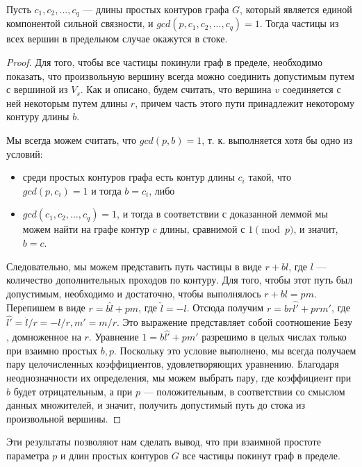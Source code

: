 \begin{theorem}
	Пусть $c_1, c_2, ... , c_q $ --- длины простых контуров графа $G$, который является единой компонентой сильной связности, и $gcd(p, c_1, c_2, ... , c_q) = 1$. Тогда частицы из всех вершин в предельном случае окажутся в стоке.
\end{theorem}

\begin{proof}	
	Для того, чтобы все частицы покинули граф в пределе, необходимо показать, что произвольную вершину всегда можно соединить допустимым путем с вершиной из $V_s$. Как и описано, будем считать, что вершина $v$ соединяется с ней некоторым путем длины $r$, причем часть этого пути принадлежит некоторому контуру длины $b$. 
	
	\newpage 
	
	Мы всегда можем считать, что $gcd(p, b) = 1$, т. к. выполняется хотя бы одно из условий:
	
	\begin{itemize}
		\item среди простых контуров графа есть контур длины $c_i$ такой, что $gcd(p, c_i) = 1$ и тогда $b = c_i$, либо
		\item $gcd(c_1, c_2, ... , c_q) = 1$, и тогда в соответствии с доказанной леммой мы можем найти на графе контур $c$ длины, сравнимой с $1\pmod p$, и значит, $b = c$.
	\end{itemize}
	
	Следовательно, мы можем представить путь частицы в виде $r + bl$, где $l$ --- количество дополнительных проходов по контуру. Для того, чтобы этот путь был допустимым, необходимо и достаточно, чтобы выполнялось $r + bl = pm$. Перепишем в виде $r = b\hat{l} + pm$, где $\hat{l} = -l$. Отсюда получим $r = br\hat{l'} + prm'$, где $\hat{l'} = \hat{l} / r = -l / r, m' = m / r$. Это выражение представляет собой соотношение Безу \cite{Hasse}, домноженное на $r$. Уравнение $1 = b\hat{l'} + pm'$ разрешимо в целых числах только при взаимно простых $b, p$. Поскольку это условие выполнено, мы всегда получаем пару целочисленных коэффициентов, удовлетворяющих уравнению. Благодаря неоднозначности их определения, мы можем выбрать пару, где коэффициент при $b$ будет отрицательным, а при $p$ --- положительным, в соответствии со смыслом данных множителей, и значит, получить допустимый путь до стока из произвольной вершины.
\end{proof}

Эти результаты позволяют нам сделать вывод, что при взаимной простоте параметра $p$ и длин простых контуров $G$ все частицы покинут граф в пределе. 

